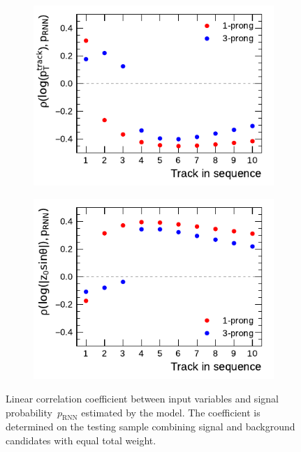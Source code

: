 \begin{figure}[htb]
  \centering
  \begin{subfigure}[t]{0.48\textwidth}
    \centering
    \includegraphics{./figures/rnn/track/pt_corr.pdf}
    \label{fig:track_rnn_corr_pt}
  \end{subfigure}\hfill
  \begin{subfigure}[t]{0.48\textwidth}
    \centering
    \includegraphics{./figures/rnn/track/z0_corr.pdf}
    \label{fig:track_rnn_corr_z0}
  \end{subfigure}
  \caption[Correlation of input variables and signal probability in the
  Track--RNN]{Linear correlation coefficient between input variables and signal
    probability~$p_\text{RNN}$ estimated by the model. The coefficient is
    determined on the testing sample combining signal and background candidates
    with equal total weight.}
  \label{fig:track_rnn_correlations}
\end{figure}

